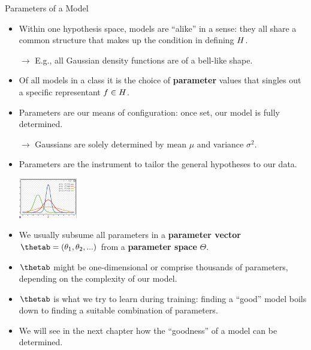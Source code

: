 \documentclass[11pt,compress,t,notes=noshow, xcolor=table]{beamer}
\begin{document}
\begin{vbframe}{Parameters of a Model}

\begin{itemize}

  \item Within one hypothesis space, models are \enquote{alike} in a sense: they 
  all share a common structure that makes up the condition in defining 
  $H$.
  
  $\rightarrow$ E.g., all Gaussian density functions are of a bell-like shape.
    
  \item Of all models in a class it is the choice of \textbf{parameter} values 
  that singles out a specific representant $f \in H$.
  
  \item Parameters are our means of configuration: once set, our model is fully
  determined.
  
  $\rightarrow$ Gaussians are solely determined by mean $\mu$ and variance
  $\sigma^2$.
  
  \item Parameters are the instrument to tailor the general 
  hypotheses to our data.

  

  
  \begin{center}
    \includegraphics[width = 0.2\textwidth]{figure_man/gaussians_placeholder.png} 
  \end{center}
  
  \framebreak
  
  \item We usually subsume all parameters in a \textbf{parameter vector} 
  $\thetab = (\theta_1, \theta_2, ...)$ from a \textbf{parameter space} 
  $\Theta$.
  
  \item $\thetab$ might be one-dimensional or comprise thousands of parameters,
  depending on the complexity of our model.
  
  \item $\thetab$ is what we try to learn during training: finding a 
  \enquote{good} model boils down to finding a suitable combination of 
  parameters.
  
  \item We will see in the next chapter how the \enquote{goodness} of a model 
  can be determined.
  
\end{itemize}

\end{vbframe}


\endlecture
\end{document}
